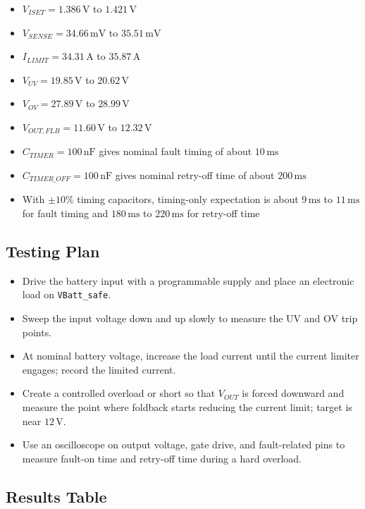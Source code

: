 \documentclass[11pt,a4paper]{article}
\begin{document}
\begin{itemize}
\item $V_{ISET} = 1.386\,\mathrm{V}$ to $1.421\,\mathrm{V}$
\item $V_{SENSE} = 34.66\,\mathrm{mV}$ to $35.51\,\mathrm{mV}$
\item $I_{LIMIT} = 34.31\,\mathrm{A}$ to $35.87\,\mathrm{A}$
\item $V_{UV} = 19.85\,\mathrm{V}$ to $20.62\,\mathrm{V}$
\item $V_{OV} = 27.89\,\mathrm{V}$ to $28.99\,\mathrm{V}$
\item $V_{OUT,FLB} = 11.60\,\mathrm{V}$ to $12.32\,\mathrm{V}$
\item $C_{TIMER} = 100\,\mathrm{nF}$ gives nominal fault timing of about $10\,\mathrm{ms}$
\item $C_{TIMER\_OFF} = 100\,\mathrm{nF}$ gives nominal retry-off time of about $200\,\mathrm{ms}$
\item With $\pm 10\%$ timing capacitors, timing-only expectation is about $9\,\mathrm{ms}$ to $11\,\mathrm{ms}$ for fault timing and $180\,\mathrm{ms}$ to $220\,\mathrm{ms}$ for retry-off time
\end{itemize}

\subsection{Testing Plan}

\begin{itemize}
\item Drive the battery input with a programmable supply and place an electronic load on \texttt{VBatt\_safe}.
\item Sweep the input voltage down and up slowly to measure the UV and OV trip points.
\item At nominal battery voltage, increase the load current until the current limiter engages; record the limited current.
\item Create a controlled overload or short so that $V_{OUT}$ is forced downward and measure the point where foldback starts reducing the current limit; target is near $12\,\mathrm{V}$.
\item Use an oscilloscope on output voltage, gate drive, and fault-related pins to measure fault-on time and retry-off time during a hard overload.
\end{itemize}

\subsection{Results Table}
\end{document}
